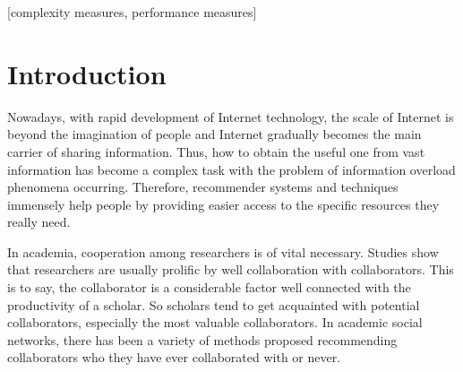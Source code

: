 \documentclass{acm_proc_article-sp}
\begin{document}
\date{30 July 1999}

\maketitle
\begin{abstract}
Due to the expansion of academic research in diverse fields, the problem of finding relevant and potential collaborators has become cumbersome. In this work, we propose an academic collaboration recommendation model called CCRec. CCRec combines publication contents with collaboration networks to effectively generate academic collaboration recommendation for researchers. Using the DBLP data sets, we conduct benchmarking experiments to examine the performance of CCRec. Our preliminary experimental results show that CCRec outperforms other state-of-the-art methods especially in addressing the topic drift problems.
\end{abstract}

[complexity measures, performance measures]



\section{Introduction}
Nowadays, with rapid development of Internet technology, the scale of Internet is beyond the imagination of people and Internet gradually becomes the main carrier of sharing information. Thus, how to obtain the useful one from vast information has become a complex task with the problem of information overload phenomena occurring. Therefore, recommender systems and techniques immensely help people by providing easier access to the specific resources they really need.

In academia, cooperation among researchers is of vital necessary. Studies show that researchers are usually prolific by well collaboration with collaborators. This is to say, the collaborator is a considerable factor well connected with the productivity of a scholar. So scholars tend to get acquainted with potential collaborators, especially the most valuable collaborators. In academic social networks, there has been a variety of methods proposed recommending collaborators who they have ever collaborated with or never.
\end{document}
